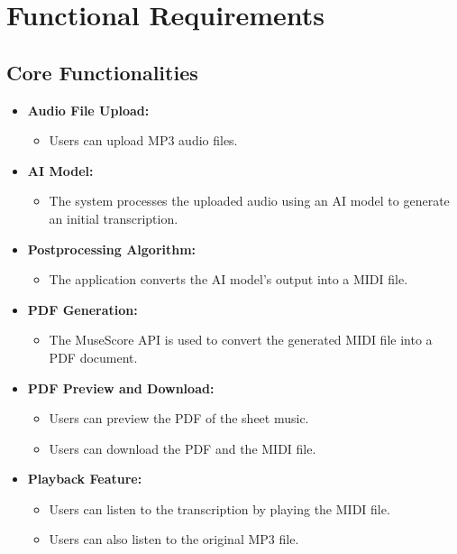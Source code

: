 \documentclass{article}
\begin{document}
\section{Functional Requirements}

\subsection{Core Functionalities}
\begin{itemize}
    \item \textbf{Audio File Upload:}
    \begin{itemize}
        \item Users can upload MP3 audio files.
    \end{itemize}
    \item \textbf{AI Model:}
    \begin{itemize}
        \item The system processes the uploaded audio using an AI model to generate an initial transcription.
    \end{itemize}
    \item \textbf{Postprocessing Algorithm:}
    \begin{itemize}
        \item The application converts the AI model's output into a MIDI file.
    \end{itemize}
    \item \textbf{PDF Generation:}
    \begin{itemize}
        \item The MuseScore API is used to convert the generated MIDI file into a PDF document.
    \end{itemize}
    \item \textbf{PDF Preview and Download:}
    \begin{itemize}
        \item Users can preview the PDF of the sheet music.
        \item Users can download the PDF and the MIDI file.
    \end{itemize}
    \item \textbf{Playback Feature:}
    \begin{itemize}
        \item Users can listen to the transcription by playing the MIDI file.
        \item Users can also listen to the original MP3 file.
    \end{itemize}
\end{itemize}
\end{document}
